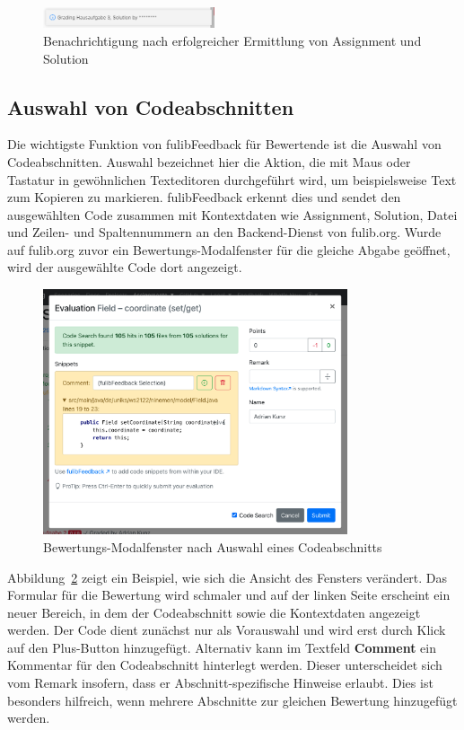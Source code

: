 \begin{figure}[h]
    \centering
    \includegraphics[width=0.45\textwidth]{images/fulibFeedback-notification}
    \caption{Benachrichtigung nach erfolgreicher Ermittlung von Assignment und Solution}
    \label{fig:fulibFeedback-notification}
\end{figure}

\subsection{Auswahl von Codeabschnitten}\label{subsec:choosing-code-snippets}

Die wichtigste Funktion von fulibFeedback für Bewertende ist die Auswahl von Codeabschnitten.
Auswahl bezeichnet hier die Aktion, die mit Maus oder Tastatur in gewöhnlichen Texteditoren durchgeführt wird, um beispielsweise Text zum Kopieren zu markieren.
fulibFeedback erkennt dies und sendet den ausgewählten Code zusammen mit Kontextdaten wie Assignment, Solution, Datei und Zeilen- und Spaltennummern an den Backend-Dienst von fulib.org.
Wurde auf fulib.org zuvor ein Bewertungs-Modalfenster für die gleiche Abgabe geöffnet, wird der ausgewählte Code dort angezeigt.

\begin{figure}
    \centering
    \includegraphics[width=0.8\textwidth]{images/fulibFeedback-snippet-good}
    \caption{Bewertungs-Modalfenster nach Auswahl eines Codeabschnitts}
    \label{fig:fulibFeedback-snippet-good}
\end{figure}

Abbildung~\ref{fig:fulibFeedback-snippet-good} zeigt ein Beispiel, wie sich die Ansicht des Fensters verändert.
Das Formular für die Bewertung wird schmaler und auf der linken Seite erscheint ein neuer Bereich, in dem der Codeabschnitt sowie die Kontextdaten angezeigt werden.
Der Code dient zunächst nur als Vorauswahl und wird erst durch Klick auf den Plus-Button hinzugefügt.
Alternativ kann im Textfeld \textbf{Comment} ein Kommentar für den Codeabschnitt hinterlegt werden.
Dieser unterscheidet sich vom Remark insofern, dass er Abschnitt-spezifische Hinweise erlaubt.
Dies ist besonders hilfreich, wenn mehrere Abschnitte zur gleichen Bewertung hinzugefügt werden.


